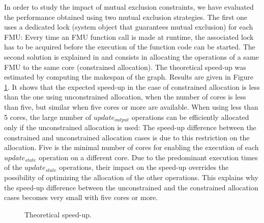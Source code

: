 In order to study the impact of mutual exclusion constraints, we have evaluated the performance obtained using two mutual exclusion strategies. The first one uses a dedicated lock (system object that guarantees mutual exclusion) for each FMU: Every time an FMU function call is made at runtime, the associated lock has to be acquired before the execution of the function code can be started. The second solution is explained in \cite{benkhaled:2014} and consists in allocating the operations of a same FMU to the same core (constrained allocation). The theoretical speed-up was estimated by computing the makespan of the graph. Results are given in Figure \ref{fig:theoretical-speedup}. It shows that the expected speed-up in the case of constrained allocation is less than the one using unconstrained allocation, when the number of cores is less than five, but similar when five cores or more are available. When using less than 5 cores, the large number of $update_{output}$ operations can be efficiently allocated only if the unconstrained allocation is used: The speed-up difference between the constrained and unconstrained allocation cases is due to this restriction on the allocation. Five is the minimal number of cores for enabling the execution of each $update_{state}$ operation on a different core. Due to the predominant execution times of the $update_{state}$ operations, their impact on the speed-up overrides the possibility of optimizing the allocation of the other operations. This explains why the speed-up difference between the unconstrained and the constrained allocation cases becomes very small with five cores or more.

\begin{figure}[phbt]
\centering
{}
\caption{Theoretical speed-up.}
\label{fig:theoretical-speedup}
\end{figure}

